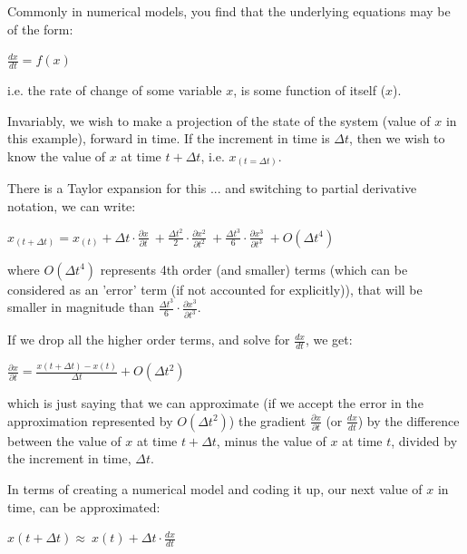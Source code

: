 \documentclass{tufte-book} %
\begin{document}
\noindent Commonly in numerical models, you find that the underlying equations may be of the form:

\vspace{2mm}
\(\frac{dx}{dt}=f(x)\)
\vspace{2mm}

\noindent i.e. the rate of change of some variable \(x\), is some function of itself (\(x\)).

Invariably, we wish to make a projection of the state of the system (value of \(x\) in this example), forward in time. If the increment in time is \(\Delta t\), then we wish to know the value of \(x\) at time \(t+\Delta t\), i.e. \(x_{(t=\Delta t)}\).

There is a Taylor expansion for this ... and switching to partial derivative notation, we can write:

\vspace{2mm}\(
x_{(t+\Delta t)}=x_{(t)} + \Delta t\cdot\frac{\partial x}{\partial t}\ + \frac{\Delta t^{2}}{2}\cdot\frac{\partial x^{2}}{\partial t^{2}}\ + \frac{\Delta t^{3}}{6}\cdot\frac{\partial x^{3}}{\partial t^{3}}\ + O(\Delta t^{4})
\)\vspace{2mm}

\noindent where \(O(\Delta t^{4})\) represents 4th order (and smaller) terms (which can be considered as an 'error' term (if not accounted for explicitly)), that will be smaller in magnitude than \(\frac{\Delta t^{3}}{6}\cdot\frac{\partial x^{3}}{\partial t^{3}}\).

If we drop all the higher order terms, and solve for \(\frac{dx}{dt}\), we get:

\vspace{2mm}\(
\frac{\partial x}{\partial t} = \frac{x(t+\Delta t)-x(t)}{\Delta t} + O(\Delta t^{2})
\)\vspace{2mm}

\noindent which is just saying that we can approximate (if we accept the error in the approximation represented by \( O(\Delta t^{2})\)) the gradient \(\frac{\partial x}{\partial t}\) (or \(\frac{dx}{dt}\)) by the difference between the value of \(x\) at time \(t+\Delta t\), minus the value of \(x\) at time \(t\), divided by the increment in time, \(\Delta t\).

In terms of creating a numerical model and coding it up, our next value of \(x\) in time, can be approximated:

\vspace{2mm}\(
x(t+\Delta t) \approx\ x(t) + \Delta t\cdot\frac{dx}{dt}
\)\vspace{2mm}
\end{document}
